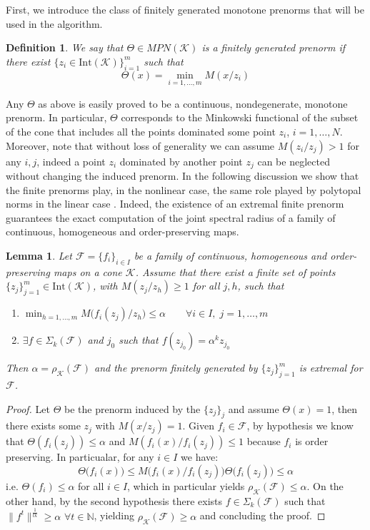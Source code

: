 \documentclass{article}
\newtheorem{lemma}[theorem]{Lemma}
\newtheorem{definition}[theorem]{Definition}
\newcommand{\N}{\mathbb{N}}
\newcommand{\family}{\mathcal{F}}
\newcommand{\cradius}{\rho_{\cone}}
\newcommand{\cone}{\mathcal{K}}
\newcommand{\interior}{\mathrm{Int}}
\begin{document}
First, we introduce the class of finitely generated monotone prenorms that will be used in the algorithm. %



%
\begin{definition}\label{Def_finite_prenorm}
  We say that $\Theta\in MPN(\cone)$ is a finitely generated prenorm if there exist $\{z_i\in \interior(\cone)\}_{i=1}^m$ such that 
$$\Theta(x)=\min_{i=1,\dots,m}M(x/z_i)$$
\end{definition}
%
Any $\Theta$ as above is easily proved to be a continuous, nondegenerate, monotone prenorm. In particular, $\Theta$ corresponds to the Minkowski functional of the subset of the cone that includes all the points dominated some point $z_i$, $i=1,\dots,N$. Moreover, note that without loss of generality we can assume $M(z_i/z_j)>1$ for any $i,j$, indeed a point $z_i$ dominated by another point $z_j$ can be neglected without changing the induced prenorm.
%
In the following discussion we show that the finite prenorms play, in the nonlinear case, the same role played by polytopal norms in the linear case \cite{guglielmi2005complex,guglielmi2013exact}. Indeed, the existence of an extremal finite prenorm guarantees the exact computation of the joint spectral radius of a family of continuous, homogeneous and order-preserving maps.
%
%
\begin{lemma}\label{Lemma_finite_prenorm_gives_spectral_radius}
    Let $\family=\{f_i\}_{i\in I}$ be a family of continuous, homogeneous and order-preserving maps on a cone $\cone$. Assume that there exist a finite set of points $\{z_j\}_{j=1}^m\in \interior(\cone)$, with $M(z_j/z_h)\geq 1$ for all $j,h$, such that
    \begin{enumerate}
        \item $\min_{h=1,\dots,m} M\big(f_i(z_j)/z_h\big)\leq \alpha \qquad \forall i\in I,\;j=1,\dots,m$
        \item $\exists f\in \Sigma_k(\family)$ and $j_0$ such that $f(z_{j_0})=\alpha^k z_{j_0}$
    \end{enumerate}
    Then $\alpha=\cradius(\family)$ and the prenorm finitely generated by $\{z_j\}_{j=1}^m$ is extremal for $\family$.
\end{lemma}
%
\begin{proof}
    Let $\Theta$ be the prenorm induced by the $\{z_j\}_j$ and assume $\Theta(x)= 1$, then there exists some $z_j$ with $M(x/z_j)= 1$. Given $f_i\in \family$, by hypothesis we know that $\Theta(f_i(z_j))\leq \alpha$ and $M(f_i(x)/f_i(z_j))\leq 1$ because $f_i$ is order preserving. In particualar, for any $i\in I$ we have: 
    \begin{equation}
    \Theta\big(f_i(x)\big)\leq M\big(f_i(x)/f_i(z_j)\big)\Theta\big(f_i(z_j)\big)\leq \alpha 
    \end{equation}
 i.e. $\Theta(f_i)\leq \alpha$ for all $i\in I$, which in particular yields $\cradius(\family)\leq \alpha$.
 On the other hand, by the second hypothesis there exists $f\in \Sigma_k(\family)$ such that $\|f^t\|^{\frac{1}{tk}}\geq \alpha$ $\forall t\in \N$, yielding $\cradius(\family)\geq \alpha$ and concluding the proof.
    \end{proof}
\end{document}
